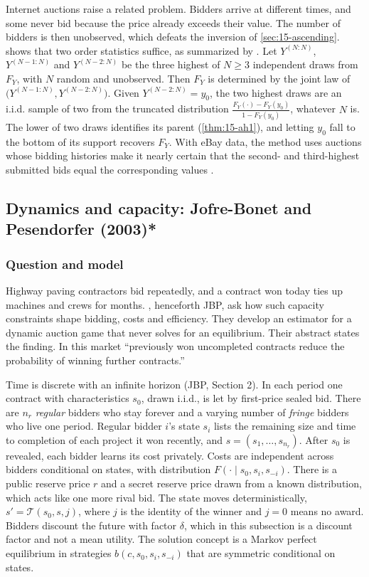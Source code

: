Internet auctions raise a related problem. Bidders arrive at different times, and some never bid
because the price already exceeds their value. The number of bidders is then unobserved, which defeats
the inversion of \cref{sec:15-ascending}. \citet{Song2004} shows that two order statistics
suffice, as summarized by \citet[Lemma 6.2]{AtheyHaile2007}. Let $Y^{(N:N)}$, $Y^{(N-1:N)}$ and
$Y^{(N-2:N)}$ be the three highest of $N\ge3$ independent draws from $F_Y$, with $N$ random and
unobserved. Then $F_Y$ is determined by the joint law of $\big(Y^{(N-1:N)},Y^{(N-2:N)}\big)$. Given
$Y^{(N-2:N)}=y_0$, the two highest draws are an i.i.d. sample of two from the truncated distribution
$\frac{F_Y(\cdot)-F_Y(y_0)}{1-F_Y(y_0)}$, whatever $N$ is. The lower of two draws identifies its parent
(\cref{thm:15-ah1}), and letting $y_0$ fall to the bottom of its support recovers $F_Y$. With eBay data,
the method uses auctions whose bidding histories make it nearly certain that the second- and
third-highest submitted bids equal the corresponding values \citep[Section 6.3.4]{AtheyHaile2007}.

\subsection{Dynamics and capacity: Jofre-Bonet and Pesendorfer (2003)*}\label{sec:15-jbp}

\subsubsection{Question and model}

Highway paving contractors bid repeatedly, and a contract won today ties up machines and crews for
months. \citet{JofreBonetPesendorfer2003}, henceforth JBP, ask how such capacity constraints shape
bidding, costs and efficiency. They develop an estimator for a dynamic auction game that never solves
for an equilibrium. Their abstract states the finding. In this market ``previously won uncompleted contracts
reduce the probability of winning further contracts.''

Time is discrete with an infinite horizon (JBP, Section 2). In each period one contract with
characteristics $s_0$, drawn i.i.d., is let by first-price sealed bid. There are $n_r$ \emph{regular}
bidders who stay forever and a varying number of \emph{fringe} bidders who live one period. Regular
bidder $i$'s state $s_i$ lists the remaining size and time to completion of each project it won
recently, and $s=(s_1,\dots,s_{n_r})$. After $s_0$ is revealed, each bidder learns its cost privately.
Costs are independent across bidders conditional on states, with distribution $F(\cdot\mid s_0,s_i,s_{-i})$.
There is a public reserve price $r$ and a secret reserve price drawn from a known distribution, which
acts like one more rival bid. The state moves deterministically, $s'=\mathcal T(s_0,s,j)$, where $j$ is
the identity of the winner and $j=0$ means no award. Bidders discount the future with factor $\delta$,
which in this subsection is a discount factor and not a mean utility. The solution concept is a
Markov perfect equilibrium in strategies $b(c,s_0,s_i,s_{-i})$ that are symmetric conditional on states.

